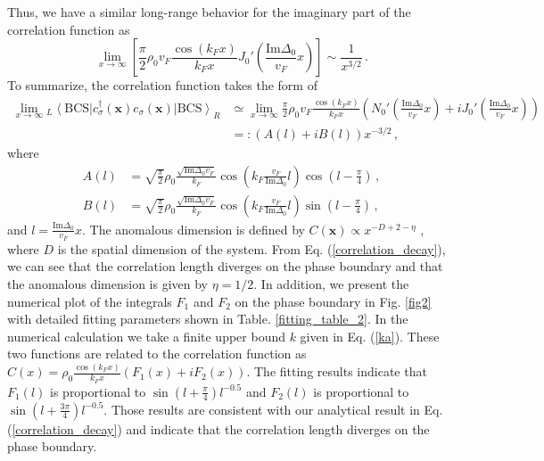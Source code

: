\documentclass[aps,onecolumn,superscriptaddress,notitlepage,longbibliography]{revtex4-1}
\begin{document}
Thus, we have a similar long-range behavior for the imaginary part of the correlation function as
\begin{equation}
	\lim_{x \rightarrow \infty} \left[  \frac{\pi}{2} \rho_0 v_F \frac{\cos (k_F x)}{k_Fx}
	J_0' \left( \frac{\text{Im} \Delta_0}{v_F} x \right) \right] \sim \frac{1}{x^{3 / 2}}\,.
	\label{Imexact}
\end{equation}
To summarize, the correlation function takes the form of
\begin{align}
  \lim_{x\rightarrow\infty}{}_L \left\langle\text{BCS} \right| c_{\sigma}^{\dagger}(\bm{x}) c_{\sigma}(\bm{x}) \left| \text{BCS}
  \right\rangle_R&\simeq \lim_{x\rightarrow\infty}\frac{\pi}{2} \rho_0 v_F \frac{\cos (k_F x)}{k_Fx}( N_0' ( \frac{\text{Im}\Delta_0}{v_F} x )+iJ_0'( \frac{\text{Im}\Delta_0}{v_F} x ))\nonumber\\
  &=:(A(l)+iB(l))x^{-3/2}\,,
  \label{correlation_decay}
\end{align}
where
\begin{align}
    A(l)&=\sqrt{\frac{\pi}{2}}\rho_0 \frac{\sqrt{\text{Im}\Delta_0 v_F}}{k_F} \cos (k_F \frac{v_F}{\text{Im}\Delta_0}l)\cos(l-\frac{\pi}{4})\,,\nonumber\\
    B(l)&=\sqrt{\frac{\pi}{2}}\rho_0 \frac{\sqrt{\text{Im}\Delta_0 v_F}}{k_F} \cos (k_F \frac{v_F}{\text{Im}\Delta_0}l)\sin(l-\frac{\pi}{4})\,,
\end{align}
and $l= \frac{\text{Im}\Delta_0}{v_F} x$. The anomalous dimension is defined by $C(\bm{x})\propto x^{-D+2-\eta}$ \cite{Sachdev:2011uj}, where $D$ is the spatial dimension of the system. From Eq. (\ref{correlation_decay}), we can see that the correlation length diverges on the phase boundary and that the anomalous dimension is given by $\eta=1/2$. In addition, we present the numerical plot of the integrals $F_1$ and $F_2$ on the phase boundary in Fig. \ref{fig2} with detailed fitting parameters shown in Table. \ref{fitting_table_2}. In the numerical calculation we take a finite upper bound $k$ given in Eq. (\ref{ka}). These two functions are related to the correlation function as $C(x)=\rho_0 \frac{\cos (k_F x)}{k_Fx}(F_1(x)+iF_2(x))$. %
The fitting results indicate that $F_1(l)$ is proportional to $\sin(l+\frac{\pi}{4})l^{-0.5}$ and $F_2(l)$ is proportional to $\sin(l+\frac{3\pi}{4})l^{-0.5}$. Those results are consistent with our analytical result in Eq. (\ref{correlation_decay}) and indicate that the correlation length diverges on the phase boundary.
\end{document}
